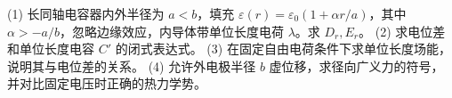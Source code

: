 (1) 长同轴电容器内外半径为 \(a<b\)，填充 \(\varepsilon(r)=\varepsilon_0(1+\alpha r/a)\)，其中 \(\alpha>-a/b\)，忽略边缘效应，内导体带单位长度电荷 \(\lambda\)。求 \(D_r,E_r\)。
(2) 求电位差和单位长度电容 \(C'\) 的闭式表达式。
(3) 在固定自由电荷条件下求单位长度场能，说明其与电位差的关系。
(4) 允许外电极半径 \(b\) 虚位移，求径向广义力的符号，并对比固定电压时正确的热力学势。
